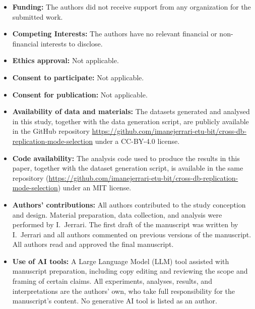 \documentclass[iicol,pdflatex,sn-mathphys-num]{sn-jnl}
\theoremstyle{thmstyleone}
\theoremstyle{thmstylethree}
\begin{document}
\begin{itemize}
\item \textbf{Funding:} The authors did not receive support from any
  organization for the submitted work.
\item \textbf{Competing Interests:} The authors have no relevant
  financial or non-financial interests to disclose.
\item \textbf{Ethics approval:} Not applicable.
\item \textbf{Consent to participate:} Not applicable.
\item \textbf{Consent for publication:} Not applicable.
\item \textbf{Availability of data and materials:} The datasets
  generated and analysed in this study, together with the data
  generation script, are publicly available in the GitHub repository
  \url{https://github.com/imanejerrari-etu-bit/cross-db-replication-mode-selection}
  under a CC-BY-4.0 license.
\item \textbf{Code availability:} The analysis code used to produce
  the results in this paper, together with the dataset generation
  script, is available in the same repository
  (\url{https://github.com/imanejerrari-etu-bit/cross-db-replication-mode-selection})
  under an MIT license.
\item \textbf{Authors' contributions:} All authors contributed to the
  study conception and design. Material preparation, data collection,
  and analysis were performed by I.~Jerrari. The first draft of the
  manuscript was written by I.~Jerrari and all authors commented on
  previous versions of the manuscript. All authors read and approved
  the final manuscript.
\item \textbf{Use of AI tools:} A Large Language Model (LLM) tool
  assisted with manuscript preparation, including copy editing and
  reviewing the scope and framing of certain claims. All experiments,
  analyses, results, and interpretations are the authors' own, who
  take full responsibility for the manuscript's content. No
  generative AI tool is listed as an author.
\end{itemize}
\end{document}
